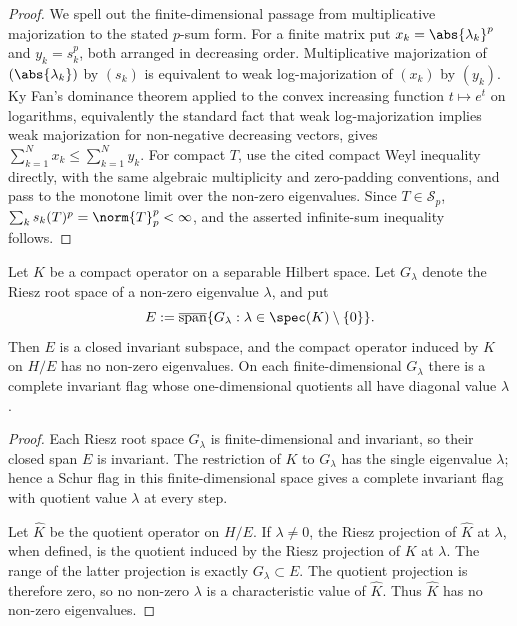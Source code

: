 \begin{proof}
  We spell out the finite-dimensional passage from multiplicative
  majorization to the stated
  \(p\)-sum form. For a finite matrix put
  \(x_k=\abs{\lambda_k}^p\) and \(y_k=s_k^p\), both arranged in decreasing
  order. Multiplicative majorization of \((\abs{\lambda_k})\) by
  \((s_k)\) is equivalent to weak log-majorization of \((x_k)\) by
  \((y_k)\). Ky Fan's dominance theorem applied to the convex increasing
  function \(t\mapsto e^t\) on logarithms, equivalently the standard fact
  that weak log-majorization implies weak majorization for non-negative
  decreasing vectors, gives
  \(\sum_{k=1}^N x_k\le\sum_{k=1}^N y_k\). For compact \(T\), use the cited
  compact Weyl inequality directly, with the same algebraic multiplicity and
  zero-padding conventions, and pass to the monotone limit over the non-zero
  eigenvalues. Since \(T\in\mathcal S_p\),
  \(\sum_k s_k(T)^p=\norm{T}_p^p<\infty\), and the asserted infinite-sum
  inequality follows.
\end{proof}

\begin{lemma}
  \label{lem:nonzero-root-space-separation}
  Let \(K\) be a compact operator on a separable Hilbert space. Let
  \(G_\lambda\) denote the Riesz root space of a non-zero eigenvalue
  \(\lambda\), and put
  \[
    E:=\overline{\operatorname{span}}
      \{G_\lambda:\lambda\in\spec(K)\setminus\{0\}\}.
  \]
  Then \(E\) is a closed invariant subspace, and the compact operator induced
  by \(K\) on \(H/E\) has no non-zero eigenvalues.  On each finite-dimensional
  \(G_\lambda\) there is a complete invariant flag whose one-dimensional
  quotients all have diagonal value \(\lambda\).
\end{lemma}

\begin{proof}
  Each Riesz root space \(G_\lambda\) is finite-dimensional and invariant, so
  their closed span \(E\) is invariant.  The restriction of \(K\) to
  \(G_\lambda\) has the single eigenvalue \(\lambda\); hence a Schur flag in
  this finite-dimensional space gives a complete invariant flag with quotient
  value \(\lambda\) at every step.

  Let \(\widehat K\) be the quotient operator on \(H/E\). If \(\lambda\ne0\),
  the Riesz projection of \(\widehat K\) at \(\lambda\), when defined, is the
  quotient induced by the Riesz projection of \(K\) at \(\lambda\). The range of
  the latter projection is exactly \(G_\lambda\subset E\). The quotient
  projection is therefore zero, so no non-zero \(\lambda\) is a characteristic
  value of \(\widehat K\). Thus \(\widehat K\) has no non-zero eigenvalues.
\end{proof}

